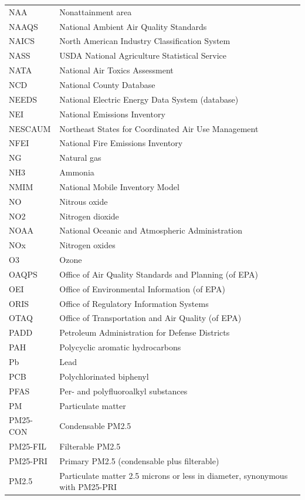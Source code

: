 \documentclass[
  11pt,
  oneside]{book}
\begin{document}
\begin{longtable}{ll}
NAA & Nonattainment area\\
\addlinespace
NAAQS & National Ambient Air Quality Standards\\
NAICS & North American Industry Classification System\\
NASS & USDA National Agriculture Statistical Service\\
NATA & National Air Toxics Assessment\\
NCD & National County Database\\
\addlinespace
NEEDS & National Electric Energy Data System (database)\\
NEI & National Emissions Inventory\\
NESCAUM & Northeast States for Coordinated Air Use Management\\
NFEI & National Fire Emissions Inventory\\
NG & Natural gas\\
\addlinespace
NH3 & Ammonia\\
NMIM & National Mobile Inventory Model\\
NO & Nitrous oxide\\
NO2 & Nitrogen dioxide\\
NOAA & National Oceanic and Atmospheric Administration\\
\addlinespace
NOx & Nitrogen oxides\\
O3 & Ozone\\
OAQPS & Office of Air Quality Standards and Planning (of EPA)\\
OEI & Office of Environmental Information (of EPA)\\
ORIS & Office of Regulatory Information Systems\\
\addlinespace
OTAQ & Office of Transportation and Air Quality (of EPA)\\
PADD & Petroleum Administration for Defense Districts\\
PAH & Polycyclic aromatic hydrocarbons\\
Pb & Lead\\
PCB & Polychlorinated biphenyl\\
\addlinespace
PFAS & Per- and polyfluoroalkyl substances\\
PM & Particulate matter\\
PM25-CON & Condensable PM2.5\\
PM25-FIL & Filterable PM2.5\\
PM25-PRI & Primary PM2.5 (condensable plus filterable)\\
\addlinespace
PM2.5 & Particulate matter 2.5 microns or less in diameter, synonymous with PM25-PRI\\

\end{longtable}
\end{document}
